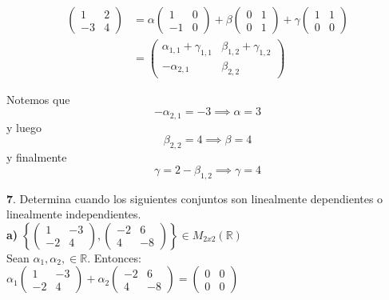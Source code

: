 \documentclass[letterpaper]{article}
\renewcommand{\*}{\cdot}
\theoremstyle{definition}
\begin{document}
\begin{align*}
 \begin{pmatrix} 1 & 2 \\ -3 & 4 \end{pmatrix} &= \alpha \begin{pmatrix} 1 & 0 \\ -1 & 0 \end{pmatrix}  + \beta \begin{pmatrix} 0 & 1 \\ 0 &1 \end{pmatrix}  + \gamma  \begin{pmatrix} 1 & 1 \\ 0 &0 \end{pmatrix} \\
  & = \begin{pmatrix} \alpha_{1,1}  + \gamma_{1,1} & \beta_{1,2} + \gamma_{1,2} \\ -\alpha_{2,1} & \beta_{2,2} \end{pmatrix}  
\end{align*}

Notemos que $$ -\alpha_{2,1} = -3  \implies  \alpha = 3$$ y luego 
$$\beta_{2,2} = 4 \implies \beta = 4 $$ y finalmente $$\gamma = 2 - \beta_{1,2} \implies \gamma = 4 $$

\noindent \textbf{7}. Determina cuando los siguientes conjuntos son linealmente dependientes o linealmente independientes. \\
  
\textbf{a)} $\left \lbrace \begin{pmatrix} 1 & -3 \\ -2 & 4 \end{pmatrix} , \begin{pmatrix} -2 & 6 \\ 4 & -8 \end{pmatrix} \right \rbrace \in M_{2x2}(\mathbb{R})$\\

Sean $\alpha _1, \alpha _2, \in \mathbb{R}$. Entonces:\\

$\alpha_1 \begin{pmatrix} 1 & -3 \\ -2 & 4 \end{pmatrix}  + \alpha_2 \begin{pmatrix} -2 & 6 \\ 4 & -8 \end{pmatrix} = \begin{pmatrix}
0 & 0 \\ 0 & 0 \end{pmatrix}$\\
\end{document}
